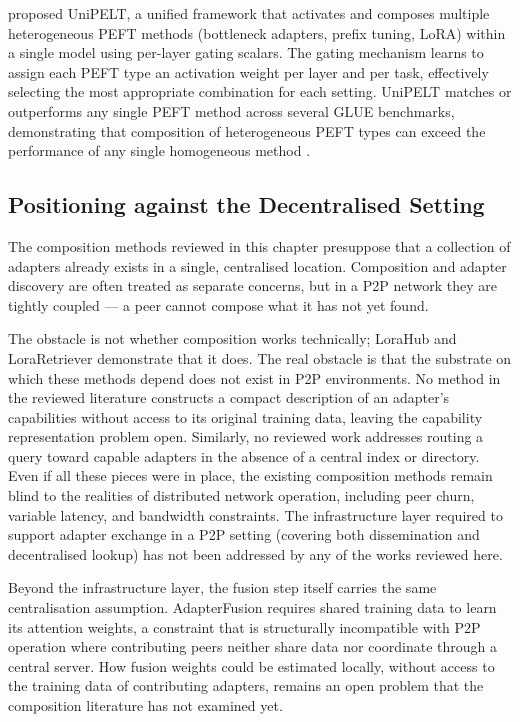 \citet{MaoUniPELT2022} proposed UniPELT, a unified framework that activates and
composes multiple heterogeneous PEFT methods (bottleneck adapters, prefix tuning, LoRA)
within a single model using per-layer gating scalars. The gating mechanism learns to
assign each PEFT type an activation weight per layer and per task, effectively selecting
the most appropriate combination for each setting. UniPELT matches or outperforms any
single PEFT method across several GLUE benchmarks\footnotemark, demonstrating that composition of
heterogeneous PEFT types can exceed the performance of any single homogeneous method
\citep{MaoUniPELT2022}.

\subsection{Positioning against the Decentralised Setting}
\label{sec:adapter_composition:implications}

The composition methods reviewed in this chapter presuppose that a collection of adapters already exists in a single, centralised location. Composition and adapter discovery are often treated as separate concerns, but in a P2P network they are tightly coupled — a peer cannot compose what it has not yet found.

The obstacle is not whether composition works technically; LoraHub and LoraRetriever demonstrate that it does. The real obstacle is that the substrate on which these methods depend does not exist in P2P environments. No method in the reviewed literature constructs a compact description of an adapter's capabilities without access to its original training data, leaving the capability representation problem open. Similarly, no reviewed work addresses routing a query toward capable adapters in the absence of a central index or directory. Even if all these pieces were in place, the existing composition methods remain blind to the realities of distributed network operation, including peer churn, variable latency, and bandwidth constraints. The infrastructure layer required to support adapter exchange in a P2P setting (covering both dissemination and decentralised lookup) has not been addressed by any of the works reviewed here.

Beyond the infrastructure layer, the fusion step itself carries the same centralisation assumption. AdapterFusion requires shared training data to learn its attention weights, a constraint that is structurally incompatible with P2P operation where contributing peers neither share data nor coordinate through a central server. How fusion weights could be estimated locally, without access to the training data of contributing adapters, remains an open problem that the composition literature has not examined yet.

